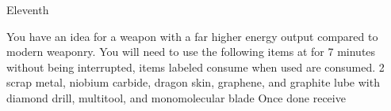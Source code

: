 \documentclass[greennotebook]{guildcamp3} %
\begin{document}
\begin{page}{Eleventh}
	
	You have an idea for a weapon with a far higher energy output compared to modern weaponry.
	You will need to use the following items at \sSciWorkbench{} for 7 minutes without being interrupted, items labeled consume when used are consumed.
	2 scrap metal, niobium carbide, dragon skin, graphene, and graphite lube with diamond drill, multitool, and monomolecular blade
	Once done receive \iUpgradedTechGun{}
	
\end{page}




\endnotebook
\end{document}
